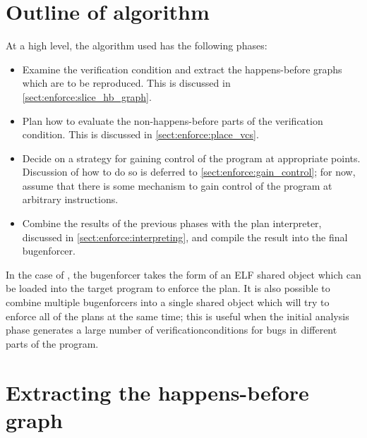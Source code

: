 \section{Outline of algorithm}

At a high level, the algorithm used has the following phases:

\begin{itemize}
\item
  Examine the verification condition and extract the happens-before
  graphs which are to be reproduced.  This is discussed in
  \autoref{sect:enforce:slice_hb_graph}.
\item
  Plan how to evaluate the non-happens-before parts of the
  verification condition.  This is discussed in
  \autoref{sect:enforce:place_vcs}.
\item
  Decide on a strategy for gaining control of the program at
  appropriate points.  Discussion of how to do so is deferred to
  \autoref{sect:enforce:gain_control}; for now, assume that there is
  some mechanism to gain control of the program at arbitrary
  instructions.
\item
  Combine the results of the previous phases with the plan
  interpreter, discussed in \autoref{sect:enforce:interpreting}, and
  compile the result into the final \gls{bugenforcer}.
\end{itemize}

In the case of {\implementation}, the \gls{bugenforcer} takes the form
of an ELF shared object which can be loaded into the target program to
enforce the plan.  It is also possible to combine multiple
\glspl{bugenforcer} into a single shared object which will try to
enforce all of the plans at the same time; this is useful when the
initial analysis phase generates a large number of
\glspl{verificationcondition} for bugs in different parts of the
program.

\section{Extracting the happens-before graph}
\label{sect:enforce:slice_hb_graph}

